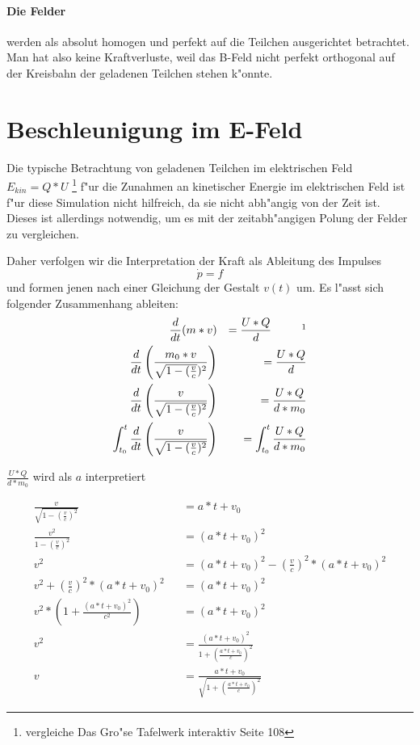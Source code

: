 \documentclass[14pt, a4paper]{report}
\begin{document}
\paragraph{Die Felder} 
werden als absolut homogen und perfekt auf die Teilchen ausgerichtet
betrachtet. Man hat also keine Kraftverluste, weil das B-Feld nicht perfekt
orthogonal auf der Kreisbahn der geladenen Teilchen stehen k"onnte.

\section{Beschleunigung im E-Feld}
Die typische Betrachtung von geladenen Teilchen im elektrischen Feld 
$E_{kin} = Q * U$ \footnote{vergleiche Das Gro"se Tafelwerk interaktiv Seite 108}
f"ur die Zunahmen an kinetischer Energie im elektrischen Feld ist f"ur diese Simulation
nicht hilfreich, da sie nicht abh"angig von der Zeit ist. Dieses ist allerdings notwendig,
um es mit der zeitabh"angigen Polung der Felder zu vergleichen. 

Daher verfolgen wir die Interpretation der Kraft als Ableitung des Impulses
\begin{equation}
\dot{p} = f 
\end{equation}
und formen jenen nach einer Gleichung der Gestalt $v(t)$ um.
\newpage
Es l"asst sich folgender Zusammenhang ableiten:
\begin{eqnarray}
\frac{d}{dt} (m * v ) && = \frac{U * Q}{d} ~~~~~~~~\footnotemark \\
\frac{d}{dt} \left(\frac{m_0 * v}{\sqrt{1 - (\frac{v}{c}})^2}\right) && = \frac{U * Q}{d} \\
\frac{d}{dt} \left(\frac{v}{\sqrt{1 - (\frac{v}{c})^2}}\right) && = \frac{U * Q}{d * m_0} \\
\int_{t_0}^t \frac{d}{dt} \left(\frac{v}{\sqrt{1 - (\frac{v}{c})^2}}\right) 
    && = \int_{t_0}^t \frac{U * Q}{d * m_0} \\
\end{eqnarray}
\begin{center}
$ \frac{U * Q}{d * m_0} $ wird als $ a $ interpretiert \label{Beschleunigung}
\end{center}
\begin{eqnarray}
\frac{v}{\sqrt{1 - \left(\frac{v}{c}\right)^2}} && = a * t + v_0 \\
\frac{v^2}{1 - \left(\frac{v}{c}\right)^2} && = \left(a * t + v_0 \right)^2 \\
v^2  && = \left(a * t + v_0\right)^2 - \left(\frac{v}{c}\right)^2 * \left(a * t + v_0 \right)^2\\
v^2 + \left(\frac{v}{c}\right)^2 * \left(a * t + v_0\right)^2 && = \left(a * t + v_0 \right)^2 \\
v^2 * \left(1 + \frac{(a * t + v_0)^2}{c^2}\right) &&  = \left(a * t + v_0\right)^2 \\
v^2 && = \frac{\left(a * t + v_0\right)^2}{1 + \left(\frac{a * t + v_0}{c}\right)^2} \\ 
v && = \frac{a * t + v_0}{\sqrt{1 + \left(\frac{a * t + v_0}{c}\right)^2}}
\end{eqnarray}
\end{document}
